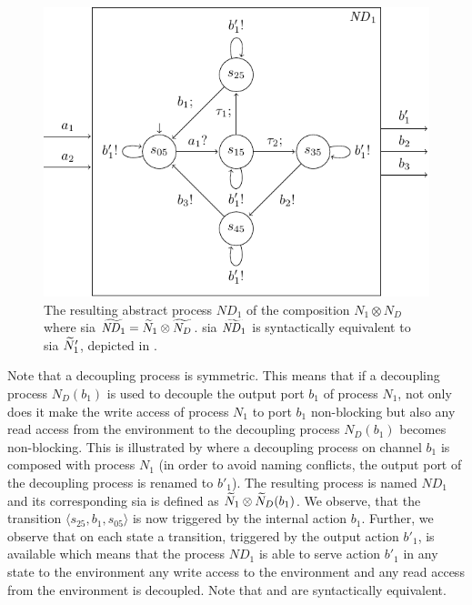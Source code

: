 \begin{figure}[bht]
    \TopFigSpace
    \centering
    \includegraphics[width=12cm]{fig/sia_decoupled_res.pdf}
    \CaptionFigSpace
    \caption{The resulting abstract process $\mathit{ND}_1$ of the composition $N_1 \otimes N_D$ where \gls{sia} $\widetilde{\mathit{ND}_1} = \widetilde{N}_1 \otimes \widetilde{N_D}$.
    \Gls{sia} $\widetilde{\mathit{ND}_1}$ is syntactically equivalent to \gls{sia} $\widetilde{N}'_1$, depicted in \Fig{\ref{fig_sia_decoupled}}.}
    \label{fig_sia_decoupled_res}
    \BotFigSpace
\end{figure}
Note that a decoupling process is symmetric.
This means that if a decoupling process $N_D(b_1)$ is used to decouple the output port $b_1$ of process $N_1$, not only does it make the write access of process $N_1$ to port $b_1$ non-blocking but also any read access from the environment to the decoupling process $N_D(b_1)$ becomes non-blocking.
This is illustrated by \Fig{\ref{fig_sia_decoupled_res}} where a decoupling process on channel $b_1$ is composed with process $N_1$ (in order to avoid naming conflicts, the output port of the decoupling process is renamed to $b'_1$).
The resulting process is named $\mathit{ND}_1$ and its corresponding \gls{sia} is defined as $\widetilde{N}_1 \otimes \widetilde{N}_D(b_1)$.
We observe, that the transition $\langle s_{25}, b_1, s_{05} \rangle$ is now triggered by the internal action $b_1$.
Further, we observe that on each state a transition, triggered by the output action $b'_1$, is available which means that the process $\mathit{ND}_1$ is able to serve action $b'_1$ in any state to the environment \ie any write access to the environment and any read access from the environment is decoupled.
Note that \Fig{\ref{fig_sia_decoupled}} and \Fig{\ref{fig_sia_decoupled_res}} are syntactically equivalent.

